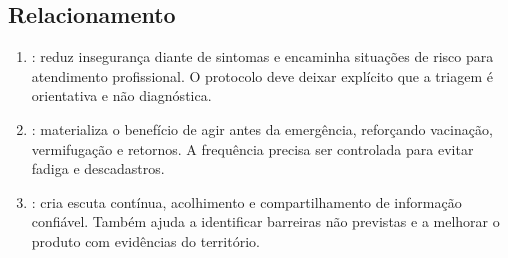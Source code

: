\subsection{Relacionamento}
\begin{enumerate}
\item {}: reduz insegurança diante de sintomas e encaminha situações de risco para atendimento profissional. O protocolo deve deixar explícito que a triagem é orientativa e não diagnóstica.
\item {}: materializa o benefício de agir antes da emergência, reforçando vacinação, vermifugação e retornos. A frequência precisa ser controlada para evitar fadiga e descadastros.
\item {}: cria escuta contínua, acolhimento e compartilhamento de informação confiável. Também ajuda a identificar barreiras não previstas e a melhorar o produto com evidências do território.
\end{enumerate}
